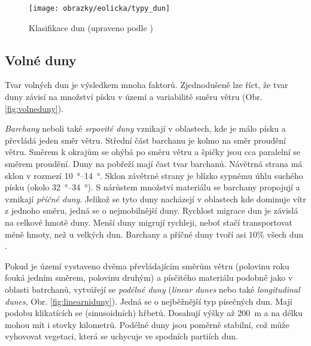 \begin{figure}
	\centering
	\texttt{[image: obrazky/eolicka/typy\_dun]}
	\caption{Klasifikace dun (upraveno podle \textcite{livingstoneAeolianGeomorphologyNew2019})}
	\label{fig:typdun}
\end{figure}

\subsection{Volné duny}
Tvar volných dun je výsledkem mnoha faktorů. Zjednodušeně lze říct, že tvar duny závisí na množství písku v území a variabilitě směru větru (Obr. \ref{fig:volneduny}). 

\emph{Barchany} neboli také \emph{srpovité duny} vznikají v oblastech, kde je málo písku a převládá jeden směr větru. Střední část barchanu je kolmo na směr proudění větru. Směrem k okrajům se ohýbá po směru větru a špičky jsou cca paralelní se směrem proudění. Duny na pobřeží mají čast tvar barchanů. Návětrná strana má sklon v rozmezí \SIrange{10}{14}{\degree}. Sklon závětrné strany je blízko sypnému úhlu suchého písku (okolo \SIrange{32}{34}{\degree}). S nárůstem množství materiálu se barchany propojují a vznikají \emph{příčné duny}. Jelikož se tyto duny nacházejí v oblastech kde dominuje vítr z jednoho směru, jedná se o nejmobilnější duny. Rychlost migrace dun je závislá na celkové hmotě duny. Menší duny migrují rychleji, neboť stačí transportovat méně hmoty, než u velkých dun. Barchany a příčné duny tvoří asi $10 \%$ všech dun \parencite{breedMorphologyDistributionDunes1979}.

Pokud je území vystaveno dvěma převládajícím směrům větru (polovinu roku fouká jedním směrem, polovinu  druhým) a písčitého materiálu podobně jako v oblasti batrchanů, vytvářejí se \emph{podélné duny} (\textit{linear dunes} nebo také \textit{longitudinal dunes}, Obr. \ref{fig:linearniduny}). Jedná se o nejběžnější typ písečných dun. Mají podobu klikatících se (sinusoidních) hřbetů. Dosahují výšky až \SI{200}{\metre} a na délku mohou mít i stovky kilometrů. Podélné duny jsou poměrně stabilní, což může vyhovovat vegetaci, která se uchycuje ve spodních partiích dun.

